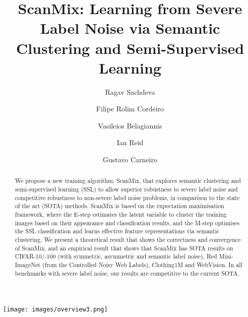 \documentclass[review]{elsarticle}
\theoremstyle{plain}
\begin{document}
\begin{frontmatter}
\title{ScanMix: Learning from Severe Label Noise via Semantic Clustering and Semi-Supervised Learning}


\author[vgg,pa_ragav]{Ragav Sachdeva}

\author[ufrpe]{Filipe Rolim Cordeiro}
\author[Magdeburg]{Vasileios Belagiannis}
\author[adelaide]{Ian Reid}
\author[adelaide,surrey]{Gustavo Carneiro}


\address[vgg]{Visual Geometry Group, Department of Engineering Science, University of Oxford, United Kingdom}
\address[adelaide]{School of Computer Science, Australian Institute for Machine Learning, Australia}
\address[ufrpe]{Visual Computing Lab, Department of Computing, Universidade Federal Rural de Pernambuco, Brazil}
\address[Magdeburg]{Otto-von-Guericke-Universit\"at Magdeburg, Germany}
\address[surrey]{Centre for Vision, Speech and Signal Processing, University of Surrey, United Kingdom}



\begin{abstract}
We propose a new training algorithm, ScanMix, that explores semantic clustering and semi-supervised learning (SSL) to allow superior robustness to severe label noise and competitive robustness to non-severe label noise problems, in comparison to the state of the art (SOTA) methods.
ScanMix is based on the expectation maximisation framework, where the E-step estimates the latent variable to cluster the training images based on their appearance and classification results, and the M-step optimises the SSL classification and learns effective feature representations via semantic clustering.
We present a theoretical result that shows the correctness and convergence of ScanMix, and an empirical result that shows that ScanMix has SOTA results on CIFAR-10/-100 (with symmetric, asymmetric and semantic label noise), Red Mini-ImageNet (from the Controlled Noisy Web Labels), Clothing1M and WebVision. 
In all benchmarks with severe label noise, our results are competitive to the current SOTA.
\end{abstract}


\begin{graphicalabstract}
\texttt{[image: images/overview3.png]}
\end{graphicalabstract}


\end{frontmatter}
\end{document}
